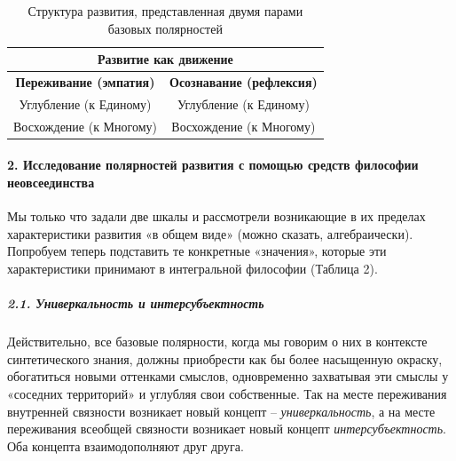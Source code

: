     \begin{table}[ht!]
    \centering
    \caption{Структура развития, представленная двумя парами базовых полярностей}
    \begin{tabular}{|c|c|}
    \hline
    \multicolumn{2}{|c|}{\textbf{Развитие как движение}} \\
    \hline
    \textbf{Переживание (эмпатия)} & \textbf{Осознавание (рефлексия)} \\
    \hline
    Углубление (к Единому) & Углубление (к Единому) \\
    \hline
    Восхождение (к Многому) & Восхождение (к Многому) \\
    \hline
    \end{tabular}
    \end{table}

    \paragraph*{2. Исследование полярностей развития с помощью средств философии неовсеединства}
    Мы только что задали две шкалы и рассмотрели возникающие в их пределах характеристики развития «в общем виде» (можно сказать, алгебраически). Попробуем теперь подставить те конкретные «значения», которые эти характеристики принимают в интегральной философии (Таблица 2).

    \subparagraph*{2.1. Универкальность и интерсубъектность}
    Действительно, все базовые полярности, когда мы говорим о них в контексте синтетического знания, должны приобрести как бы более насыщенную окраску, обогатиться новыми оттенками смыслов, одновременно захватывая эти смыслы у «соседних территорий» и углубляя свои собственные. Так на месте переживания внутренней связности возникает новый концепт – \textit{универкальность}, а на месте переживания всеобщей связности возникает новый концепт \textit{интерсубъектность}. Оба концепта взаимодополняют друг друга.

